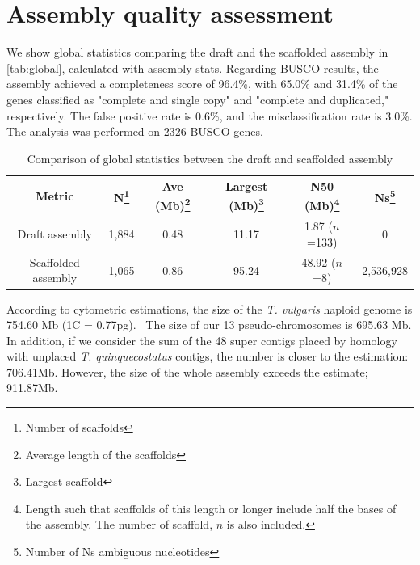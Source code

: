 \section{Assembly quality assessment}

We show global statistics comparing the draft and the scaffolded assembly in \autoref{tab:global}, calculated with assembly-stats. Regarding \ac{BUSCO} results, the assembly achieved a completeness score of 96.4\%, with 65.0\% and 31.4\% of the genes classified as "complete and single copy" and "complete and duplicated," respectively. The false positive rate is 0.6\%, and the misclassification rate is 3.0\%. The analysis was performed on 2326 \ac{BUSCO} genes. 

\begin{table}[h!]
    \begin{minipage}{\linewidth}
    \renewcommand\thefootnote{\thempfootnote}
    \centering
    \begin{tabular}{@{}cccccc@{}}
        \toprule
        Metric              & N\footnote{Number of scaffolds}    & Ave (Mb)\footnote{Average length of the scaffolds} & Largest (Mb)\footnote{Largest scaffold} & N50 (Mb)\footnote{Length such that scaffolds of this length or longer include half the bases of the assembly. The number of scaffold, $n$ is also included.}     & Ns\footnote{Number of Ns ambiguous nucleotides}      \\ \midrule
        Draft assembly      & 1,884 & 0.48     & 11.17        & 1.87 ($n$=133) & 0       \\
        Scaffolded assembly & 1,065 & 0.86     & 95.24        & 48.92 ($n$=8)  & 2,536,928 \\ \bottomrule
        \end{tabular}
        \caption{Comparison of global statistics between the draft and scaffolded assembly}
        \label{tab:global}
\end{minipage}
\end{table}

According to cytometric estimations, the size of the \textit{T. vulgaris} haploid genome is 754.60 Mb (\ac{1C} = 0.77pg).~\cite{marieCytometricExercisePlant1993,PlantDNACvalues} The size of our 13 pseudo-chromosomes is 695.63 Mb. In addition, if we consider the sum of the 48 super contigs placed by homology with unplaced \textit{T. quinquecostatus} contigs, the number is closer to the estimation:  706.41Mb. However, the size of the whole assembly exceeds the estimate; 911.87Mb.\\


